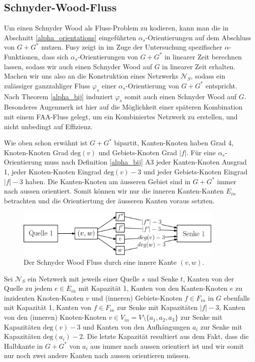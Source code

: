 \subsection{Schnyder-Wood-Fluss}

Um einen Schnyder Wood als Fluss-Problem zu kodieren, kann man die in Abschnitt \ref{alpha_orientations} eingeführten $\alpha_s$-Orientierungen auf dem Abschluss von $G+G^*$ nutzen. Fusy zeigt in \cite{fusy07} im Zuge der Untersuchung spezifischer $\alpha$-Funktionen, dass sich $\alpha_s$-Orientierungen von $G+G^*$ in linearer Zeit berechnen lassen, sodass wir auch einen Schnyder Wood auf $G$ in linearer Zeit erhalten.\\

Machen wir uns also an die Konstruktion eines Netzwerks $\mathcal{N}_S$, sodass ein zulässiger ganzzahliger Fluss $\varphi_s$ einer $\alpha_s$-Orientierung von $G+G^*$ entspricht. Nach Theorem \ref{alpha_bij} induziert $\varphi_s$ somit auch einen Schnyder Wood auf $G$. Besonderes Augenmerk ist hier auf die Möglichkeit einer späteren Kombination mit einem FAA-Fluss gelegt, um ein Kombiniertes Netzwerk zu erstellen, und nicht unbedingt auf Effizienz.

Wie oben schon erwähnt ist $G+G^*$ bipartit, Kanten-Knoten haben Grad 4, Knoten-Knoten Grad $\text{deg}(v)$ und Gebiets-Knoten Grad $|f|$. Für eine $\alpha_s$-Orientierung muss nach Definition \ref{alpha_bij} A3 jeder Kanten-Knoten Ausgrad 1, jeder Knoten-Knoten Eingrad $\text{deg}(v)-3$ und jeder Gebiets-Knoten Eingrad $|f|-3$ haben. Die Kanten-Knoten am äusseren Gebiet sind in $G+G^*$ immer nach aussen orientiert. Somit können wir nur die inneren Kanten-Kanten $E_{in}$ betrachten und die Orientiertung der äusseren Kanten voraus setzten.

\begin{figure}[h]
	\centering
  \includegraphics[width=0.9\textwidth]{schnyder_flow.png}
  \caption{Der Schnyder Wood Fluss durch eine innere Kante $(v,w)$.}
  \label{schnyder_flow}
\end{figure}

Sei $\mathcal{N}_S$ ein Netzwerk mit jeweils einer Quelle $s$ und Senke $t$, Kanten von der Quelle zu jedem $e \in E_{in}$ mit Kapazität 1, Kanten von den Kanten-Knoten $e$ zu inzidenten Knoten-Knoten $v$ und (inneren) Gebiets-Knoten $f \in F_{in}$ in $G$ ebenfalls mit Kapazität 1, Kanten von $f \in F_{in}$ zur Senke mit Kapazitäten $|f|-3$, Kanten von den (inneren) Knoten-Knoten $v \in V_{in} = V \setminus \{a_1,a_2,a_3\}$ zur Senke mit Kapazitäten $\text{deg}(v)-3$ und Kanten von den Aufhängungen $a_i$ zur Senke mit Kapazitäten $\text{deg}(a_i)-2$. Die letzte Kapazität resultiert aus dem Fakt, dass die Halbkante in $G+G^*$ von $a_i$ aus immer nach aussen orientiert ist und wir somit nur noch zwei andere Kanten nach aussen orientieren müssen.

